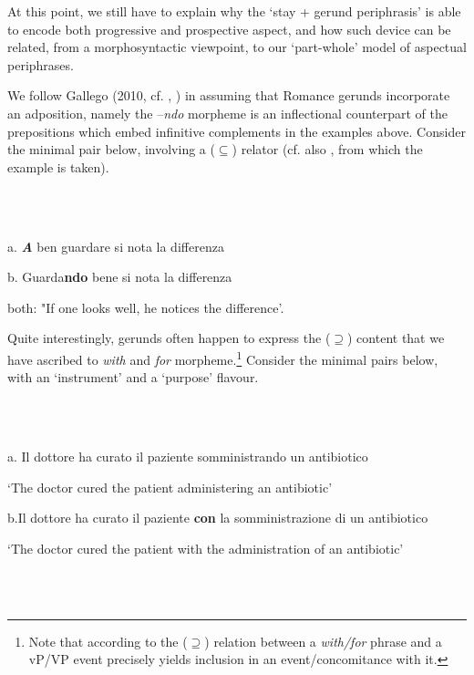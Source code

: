 \documentclass[output=paper]{langsci/langscibook}
\begin{document}
At this point, we still have to explain why the ‘stay + gerund periphrasis’ is able to encode both progressive and prospective aspect, and how such device can be related, from a morphosyntactic viewpoint, to our ‘part-whole’ model of aspectual periphrases.

We follow Gallego (2010, cf. \citealt{Mateu2002}, \citealt{Franco2015}) in assuming that Romance gerunds incorporate an adposition, namely the –\textit{ndo} morpheme is an inflectional counterpart of the prepositions which embed infinitive complements in the examples above. Consider the minimal pair below, involving a (${\subseteq}$) relator (cf. also \citealt{Casalicchio2013}, from which the example  is taken). 

\ea%
    \label{ex:key:27}
    \gll\\
        \\
    \glt
    \z

           a.  \textbf{\textit{A}} ben guardare si nota la differenza

b.  Guarda\textbf{ndo} bene si nota la differenza

both: "If one looks well, he notices the difference’.

Quite interestingly, gerunds often happen to express the (${\supseteq}$) content that we have ascribed to \textit{with} and \textit{for} morpheme.\footnote{Note that according to \citealt{FrancoManzini2017b} the (\textrm{${\supseteq}$}) relation between a \textit{with/for} phrase and a vP/VP event precisely yields inclusion in an event/concomitance with it.} Consider the minimal pairs below, with an ‘instrument’  and a ‘purpose’  flavour.

\ea%
    \label{ex:key:28}
    \gll\\
        \\
    \glt
    \z

           a. Il dottore ha curato il paziente somministrando un antibiotico

‘The doctor cured the patient administering an antibiotic’

b.Il dottore ha curato il paziente \textbf{con} la somministrazione di un antibiotico

‘The doctor cured the patient with the administration of an antibiotic’

\ea%
    \label{ex:key:29}
    \gll\\
        \\
    \glt
    \z
\end{document}
